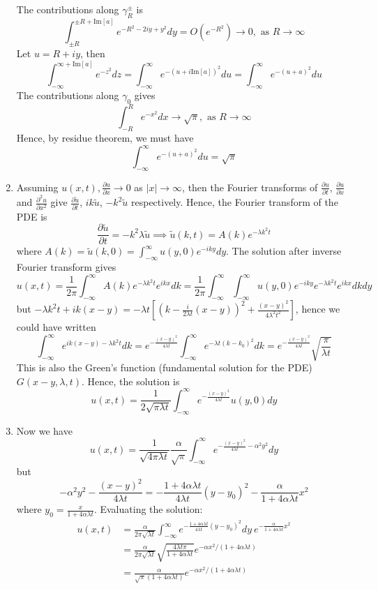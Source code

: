 \documentclass[a4paper]{article}
\begin{document}
\begin{ans}
\begin{enumerate}[label=(\alph*)]
\begin{center}
  \end{center}
 The contributions along $\gamma_R^\pm$ is
 $$\int_{\pm R}^{\pm R+\text{Im}[a]}e^{-R^2-2iy+y^2}dy=O(e^{-R^2})\rightarrow 0,\text{ as }R\rightarrow\infty$$
 Let $u=R+iy$, then 
 $$\int_{-\infty}^{\infty+\text{Im}[a]}e^{-z^2}dz=\int_{-\infty}^\infty e^{-(u+i\text{Im}[a])^2}du=\int_{-\infty}^\infty e^{-(u+a)^2}du$$
 The contributions along $\gamma_0$ gives
 $$\int_{-R}^Re^{-x^2}dx\rightarrow\sqrt{\pi},\text{ as }R\rightarrow\infty$$
 Hence, by residue theorem, we must have
 $$\int_{-\infty}^\infty e^{-(u+a)^2}du=\sqrt{\pi}$$
\item Assuming $u(x,t),\frac{\partial u}{\partial x}\rightarrow0$ as $|x|\rightarrow\infty$, then the Fourier transforms of $\frac{\partial u}{\partial t}$, $\frac{\partial u}{\partial x}$ and $\frac{\partial^2u}{\partial x^2}$ give $\frac{\partial\tilde{u}}{\partial t}$, $ik\tilde{u}$, $-k^2\tilde{u}$ respectively. Hence, the Fourier transform of the PDE is
$$\frac{\partial\tilde{u}}{\partial t}=-k^2\lambda\tilde{u}\implies\tilde{u}(k,t)=A(k)e^{-\lambda k^2t}$$
where $A(k)=\tilde{u}(k,0)=\int_{-\infty}^\infty u(y,0)e^{-iky}dy$. The solution after inverse Fourier transform gives
$$u(x,t)=\frac{1}{2\pi}\int_{-\infty}^\infty A(k)e^{-\lambda k^2t}e^{ikx}dk=\frac{1}{2\pi}\int_{-\infty}^\infty\int_{-\infty}^\infty u(y,0)e^{-iky}e^{-\lambda k^2t}e^{ikx}dkdy$$
but $-\lambda k^2t+ik(x-y)=-\lambda t[(k-\frac{i}{2\lambda t}(x-y))^2+\frac{(x-y)^2}{4\lambda^2t^2}]$, hence we could have written
$$\int_{-\infty}^\infty e^{ik(x-y)-\lambda k^2t}dk=e^{-\frac{(x-y)^2}{4\lambda t}}\int_{-\infty}^\infty e^{-\lambda t(k-k_0)^2}dk=e^{-\frac{(x-y)^2}{4\lambda t}}\sqrt{\frac{\pi}{\lambda t}}$$
This is also the Green's function (fundamental solution for the PDE) $G(x-y,\lambda,t)$. Hence, the solution is
$$u(x,t)=\frac{1}{2\sqrt{\pi\lambda t}}\int_{-\infty}^\infty e^{-\frac{(x-y)^2}{4\lambda t}}u(y,0)dy$$
\item Now we have
$$u(x,t)=\frac{1}{\sqrt{4\pi\lambda t}}\frac{\alpha}{\sqrt{\pi}}\int_{-\infty}^\infty e^{-\frac{(x-y)^2}{4\lambda t}-\alpha^2y^2}dy$$
but 
$$-\alpha^2y^2-\frac{(x-y)^2}{4\lambda t}=-\frac{1+4\alpha\lambda t}{4\lambda t}(y-y_0)^2-\frac{\alpha}{1+4\alpha\lambda t}x^2$$
where $y_0=\frac{x}{1+4\alpha\lambda t}$. Evaluating the solution:
\begin{align}
    u(x,t)&=\frac{\alpha}{2\pi\sqrt{\lambda t}}\int_{-\infty}^\infty e^{-\frac{1+4\alpha\lambda t}{4\lambda t}(y-y_0)^2}dy~ e^{-\frac{\alpha}{1+4\alpha\lambda t}x^2}\nonumber\\&=\frac{\alpha}{2\pi\sqrt{\lambda t}}\sqrt{\frac{4\lambda t\pi}{1+4\alpha\lambda t}}e^{-\alpha x^2/(1+4\alpha\lambda t)}\nonumber\\&=\frac{\alpha}{\sqrt{\pi}(1+4\alpha\lambda t)}e^{-\alpha x^2/(1+4\alpha\lambda t)}\nonumber

\end{align}
\end{enumerate}
\end{ans}
\end{document}
